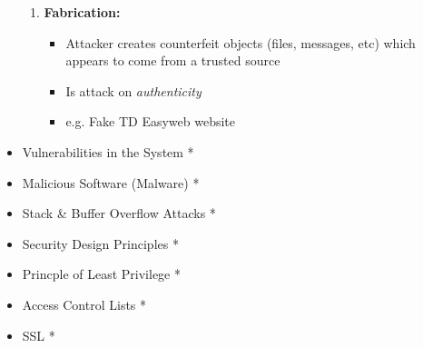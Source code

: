 \documentclass[12pt]{article}
\begin{document}
\begin{itemize}
\begin{enumerate}[1.]
        \item \textbf{Fabrication:}
        \begin{itemize}
            \item Attacker creates counterfeit objects (files, messages, etc) which
            appears to come from a trusted source
            \item Is attack on \textit{authenticity}
            \item e.g. Fake TD Easyweb website
        \end{itemize}
    \end{enumerate}
    \item Vulnerabilities in the System *
    \item Malicious Software (Malware) *
    \item Stack \& Buffer Overflow Attacks *
    \item Security Design Principles *
    \item Princple of Least Privilege *
    \item Access Control Lists *
    \item SSL *
\end{itemize}
\end{document}

